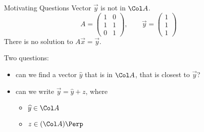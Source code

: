 \begin{frame}{Motivating Questions}
    Vector $\vec  y$ is not in $\Col A$. 
    \begin{equation*}
        A = \begin{pmatrix}
            1 & 0  \\ 1 & 1 \\  0 & 1 
        \end{pmatrix}, \qquad  
        \vec y = \begin{pmatrix} 1 \\ 1 \\ 1 
    \end{pmatrix}
    \end{equation*}
    There is no solution to $A\vec x = \vec y$. 
    
    \pause 
    
    \vspace{12pt}
    
    Two questions: 
    
    \begin{itemize}
        \item can we find a vector $ \widehat y $ that is in $\Col A$, that is closest to $ \vec y$? 
        \item can we write $\vec y = \widehat y + z$, where
        \begin{itemize}
            \item {\normalsize $\widehat y \in \Col A$}
            \item {\normalsize $z \in (\Col A)\Perp$}
        \end{itemize}
    \end{itemize}
\end{frame}


